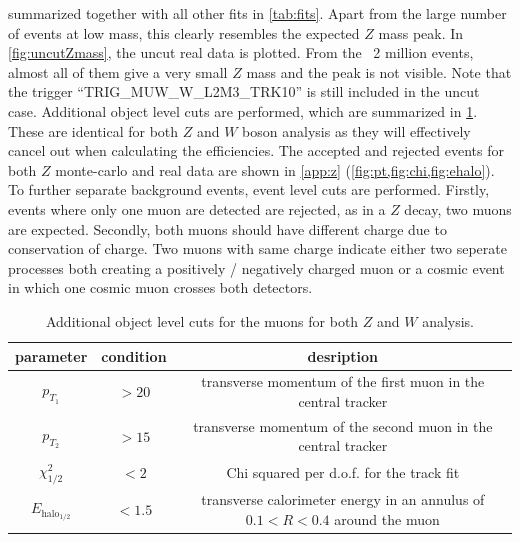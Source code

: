 \documentclass[twoside,        %
               BCOR12mm,       %
               ngerman,english, %
               fleqn,headsepline=false,footsepline=false
              ]{Vorlage/MFPREPORT}
\begin{document}
summarized together with all other fits in \cref{tab:fits}.
Apart from the large number of events at low mass, this clearly resembles the
expected $Z$ mass peak. In \cref{fig:uncutZmass}, the uncut real data is
plotted. From the ~2 million events, almost all of them give a very small $Z$
mass and the peak is not visible. Note that the trigger
``TRIG\_MUW\_W\_L2M3\_TRK10'' \cite{fprakt} is still included in the uncut case.
Additional object level cuts are performed, which are summarized in
\cref{tab:objectcuts}. These are identical for both $Z$ and $W$ boson analysis
as they will effectively cancel out when calculating the efficiencies.
The accepted and rejected events for both $Z$ monte-carlo and real data are
shown in \cref{app:z} (\cref{fig:pt,fig:chi,fig:ehalo}).
To further separate background events, event level cuts are performed. Firstly,
events where only one muon are detected are rejected, as in a $Z$ decay, two
muons are expected. Secondly, both muons should have different charge due to
conservation of charge. Two muons with same charge indicate either two seperate
processes both creating a positively / negatively charged muon or a cosmic
event in which one cosmic muon crosses both detectors.


\begin{table}
    \centering
    \begin{tabular}{|c|c|c|}\hline
        parameter&condition&desription\\\hline
        $p_{T_1}$&$>20$&transverse momentum of the first muon in the central
        tracker\\\hline
        $p_{T_2}$&$>15$&transverse momentum of the second muon in the central
        tracker \\\hline
        $\chi_{1/2}^2$&$<2$&Chi squared per d.o.f. for the track fit\\\hline
        $E_{\text{halo}_{1/2}}$&$< 1.5$&transverse calorimeter energy in an
        annulus of $0.1 < R < 0.4$ around the muon\\\hline
    \end{tabular}
    \caption{Additional object level cuts for the muons for both $Z$ and $W$
    analysis.}
    \label{tab:objectcuts}
\end{table}
\end{document}
